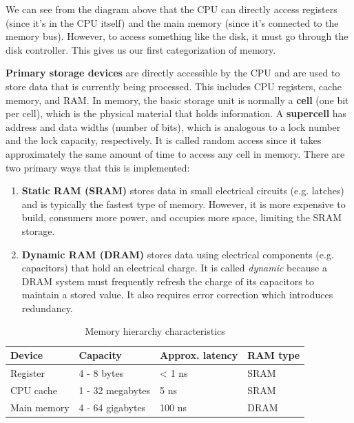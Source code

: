  We can see from the diagram above that the CPU can directly access registers (since it's in the CPU itself) and the main memory (since it's connected to the memory bus). However, to access something like the disk, it must go through the disk controller. This gives us our first categorization of memory. 

  \begin{definition}
    \textbf{Primary storage devices} are directly accessible by the CPU and are used to store data that is currently being processed. This includes CPU registers, cache memory, and RAM. In memory, the basic storage unit is normally a \textbf{cell} (one bit per cell), which is the physical material that holds information. A \textbf{supercell} has address and data widths (number of bits), which is analogous to a lock number and the lock capacity, respectively. It is called random access since it takes approximately the same amount of time to access any cell in memory. There are two primary ways that this is implemented:  
    \begin{enumerate}
      \item \textbf{Static RAM (SRAM)} stores data in small electrical circuits (e.g. latches) and is typically the fastest type of memory. However, it is more expensive to build, consumers more power, and occupies more space, limiting the SRAM storage. 
      \item \textbf{Dynamic RAM (DRAM)} stores data using electrical components (e.g. capacitors) that hold an electrical charge. It is called \textit{dynamic} because a DRAM system must frequently refresh the charge of its capacitors to maintain a stored value. It also requires error correction which introduces redundancy. 
    \end{enumerate}

    \begin{table}[H]
      \centering
      \begin{tabular}{|l|l|l|l|}
      \hline
      \textbf{Device} & \textbf{Capacity} & \textbf{Approx. latency} & \textbf{RAM type} \\ \hline
      Register & 4 - 8 bytes & < 1 ns & SRAM \\ \hline
      CPU cache & 1 - 32 megabytes & 5 ns & SRAM \\ \hline
      Main memory & 4 - 64 gigabytes & 100 ns & DRAM \\ \hline
      \end{tabular}
      \caption{Memory hierarchy characteristics}
      \label{tab:memory_hierarchy}
    \end{table}
  \end{definition}

